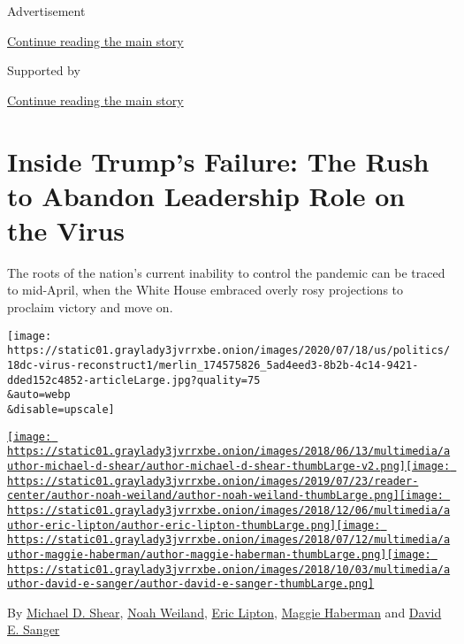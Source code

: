 Advertisement

\protect\hyperlink{after-top}{Continue reading the main story}

Supported by

\protect\hyperlink{after-sponsor}{Continue reading the main story}

\hypertarget{inside-trumps-failure-the-rush-to-abandon-leadership-role-on-the-virus}{%
\section{Inside Trump's Failure: The Rush to Abandon Leadership Role on
the
Virus}\label{inside-trumps-failure-the-rush-to-abandon-leadership-role-on-the-virus}}

The roots of the nation's current inability to control the pandemic can
be traced to mid-April, when the White House embraced overly rosy
projections to proclaim victory and move on.

\texttt{[image: https://static01.graylady3jvrrxbe.onion/images/2020/07/18/us/politics/18dc-virus-reconstruct1/merlin\_174575826\_5ad4eed3-8b2b-4c14-9421-dded152c4852-articleLarge.jpg?quality=75\\\&auto=webp\\\&disable=upscale]}

\href{https://www.nytimes3xbfgragh.onion/by/michael-d-shear}{\texttt{[image: https://static01.graylady3jvrrxbe.onion/images/2018/06/13/multimedia/author-michael-d-shear/author-michael-d-shear-thumbLarge-v2.png]}}\href{https://www.nytimes3xbfgragh.onion/by/noah-weiland}{\texttt{[image: https://static01.graylady3jvrrxbe.onion/images/2019/07/23/reader-center/author-noah-weiland/author-noah-weiland-thumbLarge.png]}}\href{https://www.nytimes3xbfgragh.onion/by/eric-lipton}{\texttt{[image: https://static01.graylady3jvrrxbe.onion/images/2018/12/06/multimedia/author-eric-lipton/author-eric-lipton-thumbLarge.png]}}\href{https://www.nytimes3xbfgragh.onion/by/maggie-haberman}{\texttt{[image: https://static01.graylady3jvrrxbe.onion/images/2018/07/12/multimedia/author-maggie-haberman/author-maggie-haberman-thumbLarge.png]}}\href{https://www.nytimes3xbfgragh.onion/by/david-e-sanger}{\texttt{[image: https://static01.graylady3jvrrxbe.onion/images/2018/10/03/multimedia/author-david-e-sanger/author-david-e-sanger-thumbLarge.png]}}

By \href{https://www.nytimes3xbfgragh.onion/by/michael-d-shear}{Michael
D. Shear},
\href{https://www.nytimes3xbfgragh.onion/by/noah-weiland}{Noah Weiland},
\href{https://www.nytimes3xbfgragh.onion/by/eric-lipton}{Eric Lipton},
\href{https://www.nytimes3xbfgragh.onion/by/maggie-haberman}{Maggie
Haberman} and
\href{https://www.nytimes3xbfgragh.onion/by/david-e-sanger}{David E.
Sanger}

